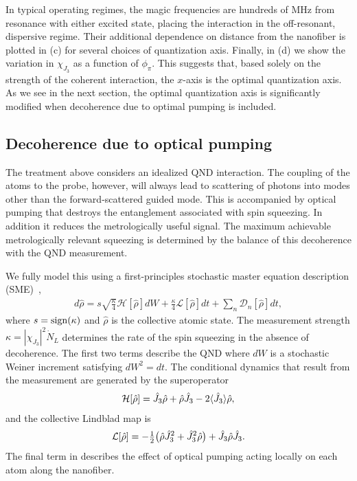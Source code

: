 \documentclass[preprint, aps,pra,onecolumn]{revtex4-1} %
\newcommand{\jz}{\hat{J}_3}
\newcommand{\chieff}{\chi_{J_3}}
\begin{document}
In typical operating regimes, the magic frequencies are hundreds of MHz from resonance with either excited state, placing the interaction in the off-resonant, dispersive regime.  
Their additional dependence on distance from the nanofiber is plotted in (c) for several choices of quantization axis.  
Finally, in (d) we show the variation in $\chieff$ as a function of $\phi_\pi$.  
This suggests that, based solely on the strength of the coherent interaction, the $x$-axis is the optimal quantization axis. 
As we see in the next section, the optimal quantization axis is significantly modified when decoherence due to optimal pumping is included.


	\subsection{Decoherence due to optical pumping}
	
The treatment above considers an idealized QND interaction. 
The coupling of the atoms to the probe, however, will always lead to scattering of photons into modes other than the forward-scattered guided mode.  
This is accompanied by optical pumping that destroys the entanglement associated with spin squeezing.  In addition it reduces the metrologically useful signal.  
The maximum achievable metrologically relevant squeezing is determined by the balance of this decoherence with the QND measurement. 

We fully model this using a first-principles stochastic master equation description (SME)~\cite{jacobs_straightforward_2006, baragiola_three-dimensional_2014},
	\begin{align} \label{Eq::SME}
		d \hat{\rho} = s\sqrt{\frac{\kappa}{4}} \mathcal{H}[\hat{\rho}] dW + \frac{\kappa}{4} \mathcal{L}[\hat{\rho}] dt + \sum_n \mathcal{D}_n [\hat{\rho}] dt,
	\end{align}
where $s = {\rm sign}(\kappa)$ and $\hat{\rho}$ is the collective atomic state. 
The measurement strength $\kappa =|\chieff|^2 \dot{N}_L$ determines the rate of the spin squeezing in the absence of decoherence.  
The first two terms describe the QND where $dW$ is a stochastic Weiner increment satisfying $dW^2 = dt$. 
The conditional dynamics that result from the measurement are generated by the superoperator
	\begin{align}
		\mathcal{H}[\hat{\rho}] = \jz \hat{\rho} + \hat{\rho} \jz - 2 \expt{\jz} \hat{\rho},
	\end{align}
and the collective Lindblad map is
	\begin{align}
		\mathcal{L}[\hat{\rho}] = - \smallfrac{1}{2} \big( \hat{\rho}  \jz^2 + \jz^2 \hat{\rho} \big) + \jz \hat{\rho} \jz.
	\end{align}
The final term in  describes the effect of optical pumping acting locally on each atom along the nanofiber. 
\end{document}
